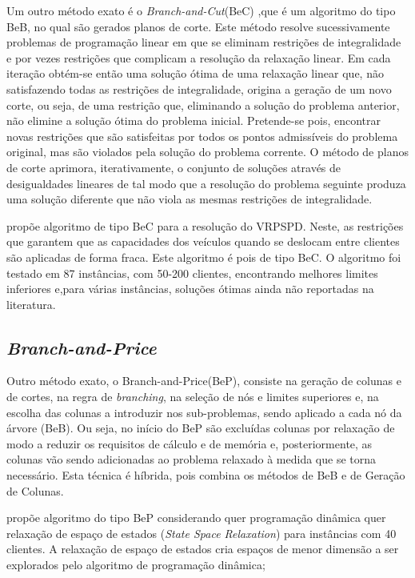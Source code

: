 Um outro método exato é o \textit{Branch-and-Cut}(BeC) \cite{lieberman10},que é um algoritmo do tipo BeB, no qual são gerados planos de corte. Este método resolve sucessivamente problemas de programação linear em que se eliminam restrições de integralidade e por vezes restrições que complicam a resolução da relaxação linear. Em cada iteração obtém-se então uma solução ótima de uma relaxação linear que, não satisfazendo todas as restrições de integralidade, origina a geração de um novo corte, ou seja, de uma restrição que, eliminando a solução do problema anterior, não elimine a solução ótima do problema inicial. Pretende-se pois, encontrar novas restrições que são satisfeitas por todos os pontos admissíveis do problema original, mas são violados pela solução do problema corrente. O método de planos de corte aprimora, iterativamente, o conjunto de soluções através de desigualdades lineares de tal modo que a resolução do problema seguinte produza uma solução diferente que não viola as mesmas restrições de integralidade.

\cite{anand11} propõe algoritmo de tipo BeC para a resolução do VRPSPD. Neste, as restrições que garantem que as capacidades dos veículos quando se deslocam entre clientes são aplicadas de forma fraca. Este algoritmo é pois de tipo BeC. O algoritmo foi testado em 87 instâncias, com 50-200 clientes, encontrando melhores limites inferiores e,para várias instâncias, soluções ótimas ainda não reportadas na literatura. 

\subsection{\textit{Branch-and-Price}}

Outro método exato, o Branch-and-Price(BeP), consiste na geração de colunas e de cortes, na regra de \textit{branching}, na seleção de nós e limites superiores e, na escolha das colunas a introduzir nos sub-problemas, sendo aplicado a cada nó da árvore (BeB). Ou seja, no início do BeP são excluídas colunas por relaxação de modo a reduzir os requisitos de cálculo e de memória e, posteriormente, as colunas vão sendo adicionadas ao problema relaxado à medida que se torna necessário. Esta técnica é híbrida, pois combina os métodos de BeB e de Geração de Colunas. 

\cite{dellamico06} propõe algoritmo do tipo BeP considerando quer programação dinâmica quer relaxação de espaço de estados (\textit{State Space Relaxation}) para instâncias com 40 clientes. A relaxação de espaço de estados cria espaços de menor dimensão a ser explorados pelo algoritmo de programação dinâmica;

